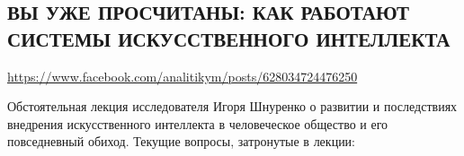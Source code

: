  
 
  
\clearpage
\subsection{ВЫ УЖЕ ПРОСЧИТАНЫ: КАК РАБОТАЮТ СИСТЕМЫ ИСКУССТВЕННОГО ИНТЕЛЛЕКТА}
\url{https://www.facebook.com/analitikym/posts/628034724476250}


Обстоятельная лекция исследователя Игоря Шнуренко о развитии и последствиях внедрения искусственного интеллекта в человеческое общество и его повседневный обиход. Текущие вопросы, затронутые в лекции:

